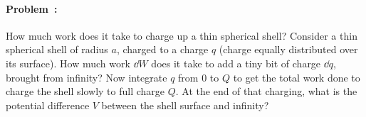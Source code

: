 \documentclass[12pt]{article}
\begin{document}
\paragraph{Problem~\theproblem:}%
How much work does it take to charge up a thin spherical shell?
Consider a thin spherical shell of radius $a$, charged to a charge
$q$ (charge equally distributed over its surface). How much work
$\dd W$ does it take to add a tiny bit of charge $\dd q$, brought
from infinity? Now integrate $q$ from $0$ to $Q$ to get the total
work done to charge the shell slowly to full charge $Q$. At the
end of that charging, what is the potential difference $V$ between
the shell surface and infinity?
\end{document}
